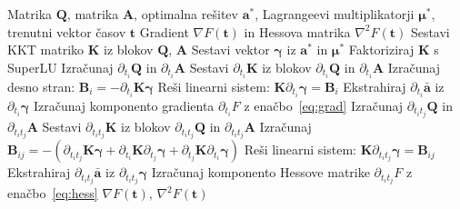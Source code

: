 \documentclass[mat2, tisk]{fmfdelo}
\newcommand{\aimplicit}{\bar{\mathbf{a}}}
\newcommand{\yimplicit}{\mathbf{\gamma}}
\newcommand{\qmat}{\mathbf{Q}}
\newcommand{\amat}{\mathbf{A}}
\newcommand{\kmat}{\mathbf{K}}
\newcommand{\avec}{\mathbf{a}}
\newcommand{\tvec}{\mathbf{t}}
\newcommand{\muvec}{\boldsymbol{\mu}}
\begin{document}
\begin{algorithm}
\caption{Izračun gradienta in Hessove matrike (gradHess)}
\label{alg:gradhess}
\begin{algorithmic}[1]
\REQUIRE Matrika $\qmat$, matrika $\amat$, optimalna rešitev $\avec^*$, Lagrangeevi multiplikatorji $\muvec^*$, trenutni vektor časov $\tvec$
\ENSURE Gradient $\nabla F(\tvec)$ in Hessova matrika $\nabla^2 F(\tvec)$
\STATE Sestavi KKT matriko $\kmat$ iz blokov $\qmat$, $\amat$
\STATE Sestavi vektor $\yimplicit$ iz $\avec^*$ in $\muvec^*$
\STATE Faktoriziraj $\kmat$ s SuperLU
    \STATE Izračunaj $\partial_{t_i}\qmat$ in $\partial_{t_i}\amat$
    \STATE Sestavi $\partial_{t_i}\kmat$ iz blokov $\partial_{t_i}\qmat$ in $\partial_{t_i}\amat$
    \STATE Izračunaj desno stran: $\mathbf{B}_i = -\partial_{t_i}\kmat \yimplicit$
    \STATE Reši linearni sistem: $\kmat \partial_{t_i}\yimplicit = \mathbf{B}_i$
    \STATE Ekstrahiraj $\partial_{t_i}\aimplicit$ iz $\partial_{t_i}\yimplicit$
    \STATE Izračunaj komponento gradienta $\partial_{t_i} F$ z enačbo~\eqref{eq:grad}
\ENDFOR
{}
        \STATE Izračunaj $\partial_{t_it_j}\qmat$ in $\partial_{t_it_j}\amat$
        \STATE Sestavi $\partial_{t_it_j}\kmat$ iz blokov $\partial_{t_it_j}\qmat$ in $\partial_{t_it_j}\amat$
        \STATE Izračunaj $\mathbf{B}_{ij} = -(\partial_{t_it_j}\kmat \yimplicit + \partial_{t_i}\kmat \partial_{t_j}\yimplicit + \partial_{t_j}\kmat \partial_{t_i}\yimplicit)$
        \STATE Reši linearni sistem: $\kmat \partial_{t_it_j}\yimplicit = \mathbf{B}_{ij}$
        \STATE Ekstrahiraj $\partial_{t_it_j}\aimplicit$ iz $\partial_{t_it_j}\yimplicit$
        \STATE Izračunaj komponento Hessove matrike $\partial_{t_it_j} F$ z enačbo~\eqref{eq:hess}
    \ENDFOR
\ENDFOR
\RETURN $\nabla F(\tvec)$, $\nabla^2 F(\tvec)$
\end{algorithmic}
\caption{Postopek izračuna gradienta in Hessove matrike cenovne funkcije $F(\tvec)$. V implementaciji smo ta algoritem optimizairali tako, da smo s pomočjo vektorizacije in vektorskih operacij, ki jih ponuja paket NumPy, izračunali vse parcialne odvode $\partial_{t_i} \aimplicit$ in $\partial_{t_it_j} \aimplicit$ v enem klicu funkcije, namesto da bi zanko po komponentah izvajali ločeno. Natančnejši opis optimizacije algoritma je podan v dodatku~\ref{app:implementation}.}
\end{algorithm}
\end{document}
